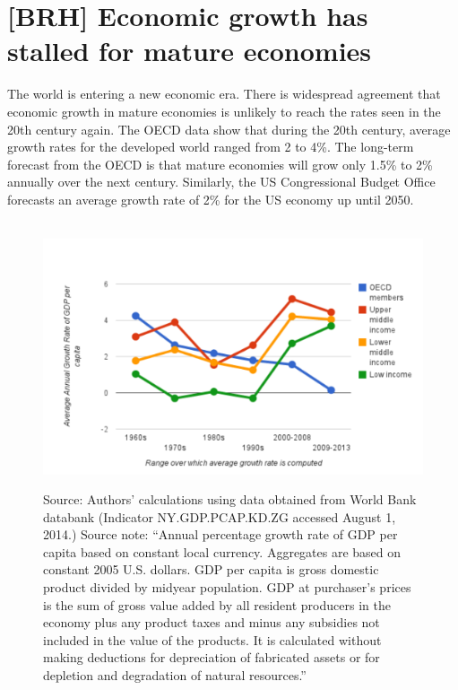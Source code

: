 \section{[BRH] Economic growth  has stalled for mature economies}
\label{sec:growth_has_slowed}

The world is entering a new economic era. There is widespread agreement that economic growth in mature economies is unlikely to reach the rates seen in the 20th century again.  The OECD data show that during the 20th century, average growth rates for the developed world ranged from 2 to 4\%. The long-term forecast from the OECD is that mature economies will grow only 1.5\% to 2\% annually over the next century. Similarly, the US Congressional Budget Office forecasts an average growth rate of 2\% for the US economy up until 2050.\cite{OECD2014,CBO2014}



\begin{figure}[!ht]
\centering\
\includegraphics[width=\linewidth]{Part_0/Chapter_Introduction/images/GDPPC.pdf}
\caption[The traditional model]{Source: Authors' calculations using 
data obtained from World Bank databank (Indicator NY.GDP.PCAP.KD.ZG accessed August 1, 2014.)
Source note: ``Annual percentage growth rate of GDP per capita based on constant local currency. Aggregates are based on constant 2005 U.S. dollars. GDP per capita is gross domestic product divided by midyear population. GDP at purchaser's prices is the sum of gross value added by all resident producers in the economy plus any product taxes and minus any subsidies not included in the value of the products. It is calculated without making deductions for depreciation of fabricated assets or for depletion and degradation of natural resources.''}
\label{fig:gdppc}
\end{figure}

